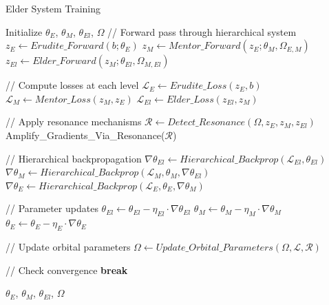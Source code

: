 \begin{algorithm}
\caption{Elder System Training}
\begin{algorithmic}[1]
\State Initialize $\theta_E$, $\theta_M$, $\theta_{El}$, $\Omega$
        \State // Forward pass through hierarchical system
        \State $z_E \gets Erudite\_Forward(b; \theta_E)$
        \State $z_M \gets Mentor\_Forward(z_E; \theta_M, \Omega_{E,M})$
        \State $z_{El} \gets Elder\_Forward(z_M; \theta_{El}, \Omega_{M,El})$
        
        \State // Compute losses at each level
        \State $\mathcal{L}_E \gets Erudite\_Loss(z_E, b)$
        \State $\mathcal{L}_M \gets Mentor\_Loss(z_M, z_E)$
        \State $\mathcal{L}_{El} \gets Elder\_Loss(z_{El}, z_M)$
        
        \State // Apply resonance mechanisms
        \State $\mathcal{R} \gets Detect\_Resonance(\Omega, z_E, z_M, z_{El})$
        \State Amplify\_Gradients\_Via\_Resonance($\mathcal{R}$)
        
        \State // Hierarchical backpropagation
        \State $\nabla \theta_{El} \gets Hierarchical\_Backprop(\mathcal{L}_{El}, \theta_{El})$
        \State $\nabla \theta_M \gets Hierarchical\_Backprop(\mathcal{L}_M, \theta_M, \nabla \theta_{El})$
        \State $\nabla \theta_E \gets Hierarchical\_Backprop(\mathcal{L}_E, \theta_E, \nabla \theta_M)$
        
        \State // Parameter updates
        \State $\theta_{El} \gets \theta_{El} - \eta_{El} \cdot \nabla \theta_{El}$
        \State $\theta_M \gets \theta_M - \eta_M \cdot \nabla \theta_M$
        \State $\theta_E \gets \theta_E - \eta_E \cdot \nabla \theta_E$
        
        \State // Update orbital parameters
        \State $\Omega \gets Update\_Orbital\_Parameters(\Omega, \mathcal{L}, \mathcal{R})$
    \EndFor
    
    \State // Check convergence
        \State \textbf{break}
    \EndIf
\EndFor

\State \Return $\theta_E$, $\theta_M$, $\theta_{El}$, $\Omega$
\end{algorithmic}
\end{algorithm}

